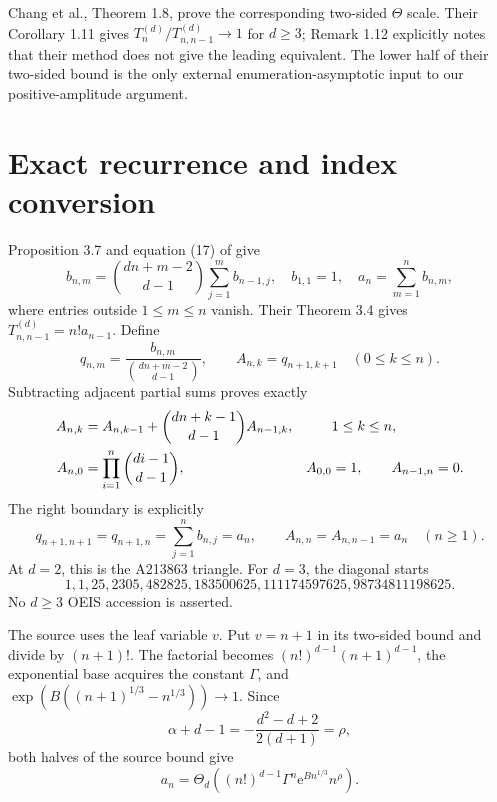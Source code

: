 \documentclass[11pt,letterpaper]{article}
\newcommand{\ee}{\mathrm e}
\theoremstyle{remark}
\begin{document}
Chang et al., Theorem 1.8, prove the corresponding two-sided $\Theta$ scale. Their Corollary 1.11 gives $T_n^{(d)}/T_{n,n-1}^{(d)}\to1$ for $d\ge3$; Remark 1.12 explicitly notes that their method does not give the leading equivalent. The lower half of their two-sided bound is the only external enumeration-asymptotic input to our positive-amplitude argument.

\section{Exact recurrence and index conversion}\label{tcn:d:sec:recurrence}
Proposition 3.7 and equation (17) of \cite{Chang2024} give
\begin{equation}\label{tcn:d:brec}
 b_{n,m}=\binom{dn+m-2}{d-1}\sum_{j=1}^m b_{n-1,j},
 \quad b_{1,1}=1,\quad a_n=\sum_{m=1}^n b_{n,m},
\end{equation}
where entries outside $1\le m\le n$ vanish. Their Theorem 3.4 gives $T_{n,n-1}^{(d)}=n!a_{n-1}$. Define
\[
 q_{n,m}=\frac{b_{n,m}}{\binom{dn+m-2}{d-1}},\qquad
 A_{n,k}=q_{n+1,k+1}\quad(0\le k\le n).
\]
Subtracting adjacent partial sums proves exactly
\begin{align}
 A_{n,k}&=A_{n,k-1}+\binom{dn+k-1}{d-1}A_{n-1,k},
           &&1\le k\le n,\label{tcn:d:Arec}\\
 A_{n,0}&=\prod_{i=1}^n\binom{di-1}{d-1},& A_{0,0}&=1,
 \qquad A_{n-1,n}=0.\notag
\end{align}
The right boundary is explicitly
\[
 q_{n+1,n+1}=q_{n+1,n}=\sum_{j=1}^n b_{n,j}=a_n,
 \qquad A_{n,n}=A_{n,n-1}=a_n\quad(n\ge1).
\]
At $d=2$, this is the A213863 triangle. For $d=3$, the diagonal starts
\[
 1,1,25,2305,482825,183500625,111174597625,98734811198625.
\]
No $d\ge3$ OEIS accession is asserted.

The source uses the leaf variable $v$. Put $v=n+1$ in its two-sided bound and divide by $(n+1)!$. The factorial becomes $(n!)^{d-1}(n+1)^{d-1}$, the exponential base acquires the constant $\Gamma$, and
$\exp(B((n+1)^{1/3}-n^{1/3}))\to1$. Since
\[
 \alpha+d-1=-\frac{d^2-d+2}{2(d+1)}=\rho,
\]
both halves of the source bound give
\begin{equation}\label{tcn:d:theta}
 a_n=\Theta_d\left((n!)^{d-1}\Gamma^n\ee^{Bn^{1/3}}n^\rho\right).
\end{equation}
\end{document}
